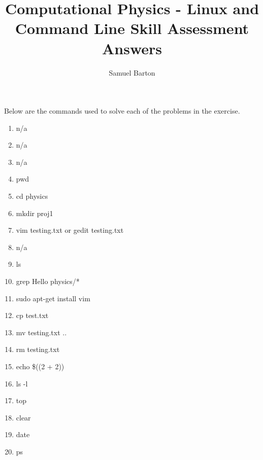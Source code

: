 \documentclass{article}
\title{Computational Physics - Linux and Command Line Skill Assessment Answers}
\author {Samuel Barton}
\begin{document}
	
	\maketitle
	
Below are the commands used to solve each of the problems in the exercise.
	
	\begin{enumerate}
		\item n/a
		\item n/a
		\item n/a
		\item pwd
		\item cd physics
		\item mkdir proj1
		\item vim testing.txt or gedit testing.txt
		\item n/a
		\item ls
		\item grep Hello physics/*
		\item sudo apt-get install vim
		\item cp test.txt ~
		\item mv testing.txt ..
		\item rm testing.txt
		\item echo \$((2 + 2))
		\item ls -l
		\item top
		\item clear
		\item date
		\item ps
	\end{enumerate}
\end{document}
